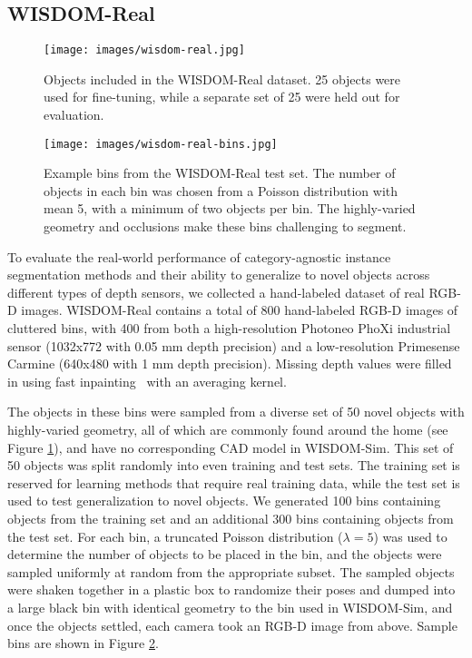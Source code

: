 \documentclass[letterpaper, 10 pt, conference]{ieeeconf}  \pdfoutput=1
\numberwithin{equation}{section}
\begin{document}
\subsection{WISDOM-Real} 

\begin{figure}[h]
    \centering
    \texttt{[image: images/wisdom-real.jpg]}
    \caption{Objects included in the WISDOM-Real dataset. 25 objects were used for fine-tuning, while a separate set of 25 were held out for evaluation.}
  \label{fig:real_dataset} 
\end{figure}

\begin{figure}[h]
    \centering
    \texttt{[image: images/wisdom-real-bins.jpg]}
    \caption{Example bins from the WISDOM-Real test set. The number of objects in each bin was chosen from a Poisson distribution with mean 5, with a minimum of two objects per bin. The highly-varied geometry and occlusions make these bins challenging to segment.}
  \label{fig:real_bins} 
\end{figure}

To evaluate the real-world performance of category-agnostic instance segmentation methods and their ability to generalize to novel objects across different types of depth sensors, we collected a hand-labeled dataset of real RGB-D images.
WISDOM-Real contains a total of 800 hand-labeled RGB-D images of cluttered bins, with 400 from both a high-resolution Photoneo PhoXi industrial sensor (1032x772 with 0.05 mm depth precision) and a low-resolution Primesense Carmine (640x480 with 1 mm depth precision). 
Missing depth values were filled in using fast inpainting~\cite{richard2001fast} with an averaging kernel.

The objects in these bins were sampled from a diverse set of 50 novel objects with highly-varied geometry, all of which are commonly found around the home (see Figure \ref{fig:real_dataset}), and have no corresponding CAD model in WISDOM-Sim.
This set of 50 objects was split randomly into even training and test sets.
The training set is reserved for learning methods that require real training data, while the test set is used to test generalization to novel objects.
We generated 100 bins containing objects from the training set and an additional 300 bins containing objects from the test set.
For each bin, a truncated Poisson distribution ($\lambda=5$) was used to determine the number of objects to be placed in the bin, and the objects were sampled uniformly at random from the appropriate subset.
The sampled objects were shaken together in a plastic box to randomize their poses and dumped into a large black bin with identical geometry to the bin used in WISDOM-Sim, and once the objects settled, each camera took an RGB-D image from above.
Sample bins are shown in Figure \ref{fig:real_bins}.
\end{document}
